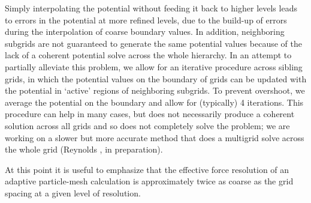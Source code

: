 Simply interpolating the potential without feeding it back to higher levels leads to errors in the potential at more refined levels, due to the build-up of errors during the interpolation of coarse boundary values.  In addition, neighboring subgrids are not guaranteed to generate the same potential values because of the lack of a coherent potential solve across the whole hierarchy. In an attempt to partially alleviate this problem, we allow for an iterative procedure across sibling grids, in which the potential values on the boundary of grids can be updated with the potential in `active' regions of neighboring subgrids.  To prevent overshoot, we average the potential on the boundary and allow for (typically) 4 iterations.  This procedure can help in many cases, but does not necessarily produce a coherent solution across all grids and so does not completely solve the problem; we are working on a slower but more accurate method that does a multigrid solve across the whole grid (Reynolds \etal, in preparation).

At this point it is useful to emphasize that the effective force resolution of an adaptive particle-mesh calculation is approximately twice as coarse as the grid spacing at a given level of resolution.
